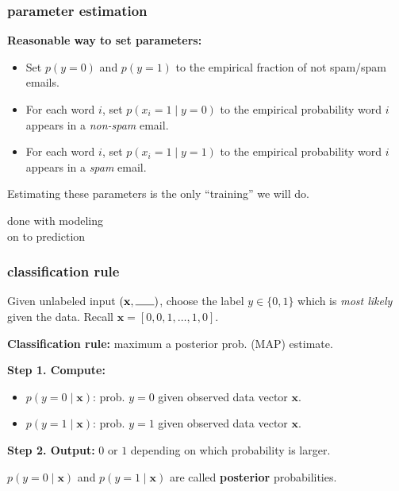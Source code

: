\documentclass[handout,compress]{beamer}
\newcommand{\bv}[1]{\mathbf{#1}}
\begin{document}
\begin{frame}
	\frametitle{parameter estimation}
	\textbf{Reasonable way to set parameters:}
	\begin{itemize}
		\item Set $p(y = 0)$ and $p(y = 1)$ to the empirical fraction of not spam/spam emails.
		\item For each word $i$, set $p(x_i = 1 \mid y=0)$ to the empirical probability word $i$ appears in a \emph{non-spam} email.
		\item For each word $i$, set $p(x_i = 1 \mid y=1)$ to the empirical probability word $i$ appears in a \emph{spam} email.
	\end{itemize} 
	\begin{center}
		\alert{Estimating these parameters is the only ``training'' we will do.}
	\end{center}
\end{frame}

\begin{frame}[standout]
	done with modeling \\
	\alert{on to prediction}
\end{frame}

%
%

\begin{frame}
	\frametitle{classification rule}
	Given unlabeled input $(\bv{x},\rule{.6cm}{0.15mm})$, choose the label $y \in \{0,1\}$ which is \emph{most likely} given the data. Recall $\bv{x} = [0,0,1,\ldots, 1, 0]$. 
	
	\begin{center}
		\textbf{Classification rule:} \alert{maximum a posterior prob. (MAP) estimate.}
	\end{center}
	\textbf{Step 1. Compute:}
	\begin{itemize}
		\item $p(y=0 \mid \bv{x})$: prob. $y = 0$ given observed data vector $\bv{x}$. 
		\item $p(y=1 \mid \bv{x})$: prob. $y = 1$ given observed data vector $\bv{x}$. 
	\end{itemize}
	\textbf{Step 2. Output:} $0$ or $1$ depending on which probability is larger.
	
	\begin{center}
		$p(y=0 \mid \bv{x})$ and $p(y=1 \mid \bv{x})$ are called \textbf{\alert{posterior}} probabilities.
	\end{center}
\end{frame}
\end{document}
